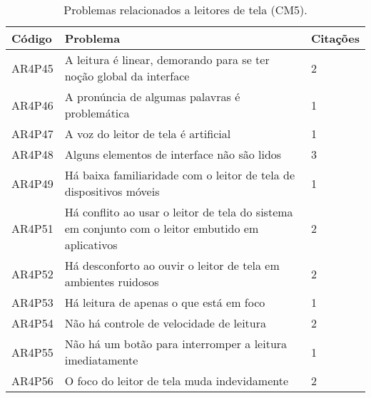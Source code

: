 \begin{table}[htb]
  \begin{center}
    \ABNTEXfontereduzida
    \caption{Problemas relacionados a leitores de tela (CM5).}
    \label{tab-pro-lei-tel-1}
    \begin{tabular}{p{1.2cm}|p{12.0cm}|p{1.4cm}}
      \textbf{Código} & \textbf{Problema}                                                                                & \textbf{Citações} \\
      \hline
      AR4P45          & A leitura é linear, demorando para se ter noção global da interface                              & 2                 \\
      \hline
      AR4P46          & A pronúncia de algumas palavras é problemática                                                   & 1                 \\
      \hline
      AR4P47          & A voz do leitor de tela é artificial                                                             & 1                 \\
      \hline
      AR4P48          & Alguns elementos de interface não são lidos                                                      & 3                 \\
      \hline
      AR4P49          & Há baixa familiaridade com o leitor de tela de dispositivos móveis                               & 1                 \\
      \hline
      AR4P51          & Há conflito ao usar o leitor de tela do sistema em conjunto com o leitor embutido em aplicativos & 2                 \\
      \hline
      AR4P52          & Há desconforto ao ouvir o leitor de tela em ambientes ruidosos                                   & 2                 \\
      \hline
      AR4P53          & Há leitura de apenas o que está em foco                                                          & 1                 \\
      \hline
      AR4P54          & Não há controle de velocidade de leitura                                                         & 2                 \\
      \hline
      AR4P55          & Não há um botão para interromper a leitura imediatamente                                         & 1                 \\
      \hline
      AR4P56          & O foco do leitor de tela muda indevidamente                                                      & 2                 \\

\end{tabular}
\end{center}
\end{table}
